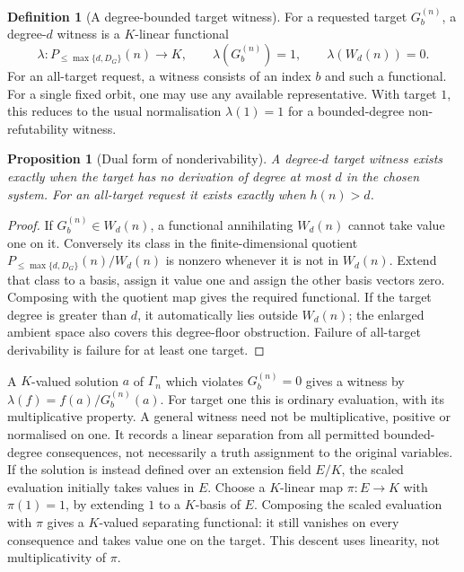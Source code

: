\documentclass[11pt,a4paper,oneside,openany]{book}
\newtheorem{proposition}[theorem]{Proposition}
\theoremstyle{definition}\newtheorem{definition}[theorem]{Definition}
\theoremstyle{remark}\newtheorem{remark}[theorem]{Remark}
\numberwithin{equation}{chapter}
\begin{document}
\begin{definition}[A degree-bounded target witness]
\label{tx:def:consistency-witness}
For a requested target $G_b^{(n)}$, a degree-$d$ witness is a $K$-linear
functional
\[
 \lambda:P_{\le\max\{d,D_G\}}(n)\longrightarrow K,\qquad
 \lambda(G_b^{(n)})=1,\qquad\lambda(W_d(n))=0.
\]
For an all-target request, a witness consists of an index $b$ and such
a functional. For a single fixed orbit, one may use any available
representative. With target $1$, this reduces to the usual normalisation
$\lambda(1)=1$ for a bounded-degree non-refutability witness.
\end{definition}

\begin{proposition}[Dual form of nonderivability]
\label{tx:prop:dual-witness}
A degree-$d$ target witness exists exactly when the target has no
derivation of degree at most $d$ in the chosen system. For an all-target
request it exists exactly when $h(n)>d$.
\end{proposition}
\begin{proof}
If $G_b^{(n)}\in W_d(n)$, a functional annihilating $W_d(n)$ cannot
take value one on it. Conversely its class in the finite-dimensional
quotient $P_{\le\max\{d,D_G\}}(n)/W_d(n)$ is nonzero whenever
it is not in $W_d(n)$. Extend that class to a basis, assign it value
one and assign the other basis vectors zero. Composing with the
quotient map gives the required functional. If the target degree is
greater than $d$, it automatically lies outside $W_d(n)$; the enlarged
ambient space also covers this degree-floor obstruction. Failure of
all-target derivability is failure for at least one target.
\end{proof}

A $K$-valued solution $a$ of $\Gamma_n$ which violates $G_b^{(n)}=0$ gives a
witness by $\lambda(f)=f(a)/G_b^{(n)}(a)$. For target one this is ordinary
evaluation, with its multiplicative property. A general witness need
not be multiplicative, positive or normalised on one. It records a
linear separation from all permitted bounded-degree consequences,
not necessarily a truth assignment to the original variables. If the solution is instead defined over an extension field $E/K$, the scaled evaluation initially takes values in $E$. Choose a $K$-linear map $\pi:E\to K$ with $\pi(1)=1$, by extending $1$ to a $K$-basis of $E$. Composing the scaled evaluation with $\pi$ gives a $K$-valued separating functional: it still vanishes on every consequence and takes value one on the target. This descent uses linearity, not multiplicativity of $\pi$.
\end{document}
